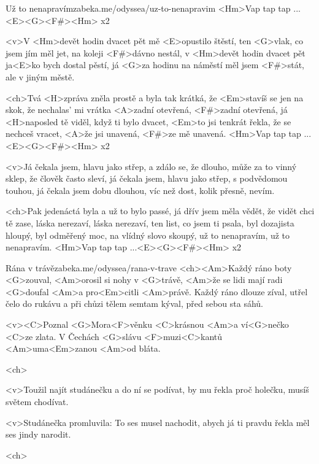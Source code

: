 \begin{song}{39}{Už to nenapravím}{zabeka.me/odyssea/uz-to-nenapravim}
<Hm>Vap tap tap ...<E><G><F#><Hm> x2

<v>V <Hm>devět hodin dvacet pět mě <E>opustilo štěstí,
ten <G>vlak, co jsem jím měl jet, na koleji <F#>dávno nestál,
v <Hm>devět hodin dvacet pět ja<E>ko bych dostal pěstí,
já <G>za hodinu na náměstí měl jsem <F#>stát, 
ale v jiným městě.

<ch>Tvá <H>zpráva zněla prostě a byla tak krátká,
že <Em>stavíš se jen na skok, že nechalas' mi vrátka
<A>zadní otevřená, <F#>zadní otevřená,
já <H>naposled tě viděl, když ti bylo dvacet,
<Em>to jsi tenkrát řekla, že se nechceš vracet,
<A>že jsi unavená, <F#>ze mě unavená.
<Hm>Vap tap tap ...<E><G><F#><Hm> x2

<v>Já čekala jsem, hlavu jako střep, a zdálo se, že dlouho,
může za to vinný sklep, že člověk často sleví,
já čekala jsem, hlavu jako střep, s podvědomou touhou,
já čekala jsem dobu dlouhou, víc než dost, kolik přesně, nevím.

<ch>Pak jedenáctá byla a už to bylo passé,
já dřív jsem měla vědět, že vidět chci tě zase,
láska nerezaví, láska nerezaví,
ten list, co jsem ti psala, byl dozajista hloupý,
byl odměřený moc, na vlídný slovo skoupý,
už to nenapravím, už to nenapravím.
<Hm>Vap tap tap ...<E><G><F#><Hm> x2
\end{song}
\begin{song}{40}{Rána v trávě}{zabeka.me/odyssea/rana-v-trave}
<ch><Am>Každý ráno boty <G>zouval, 
<Am>orosil si nohy v <G>trávě, 
<Am>že se lidi mají radi <G>doufal 
<Am>a pro<Em>citli <Am>právě. 
Každý ráno dlouze zíval, 
utřel čelo do rukávu 
a při chůzi tělem semtam kýval,
před sebou sta sáhů. 

<v><C>Poznal <G>Mora<F>věnku <C>krásnou 
<Am>a ví<G>nečko <C>ze zlata.
V Čechách <G>slávu <F>muzi<C>kantů 
<Am>uma<Em>zanou <Am>od bláta.

<ch>

<v>Toužil najít studánečku 
a do ní se podívat, 
by mu řekla proč holečku,
musíš světem chodívat.

<v>Studánečka promluvila: 
To ses musel nachodit,
abych já ti pravdu řekla 
měl ses jindy narodit. 

<ch>
\end{song}
